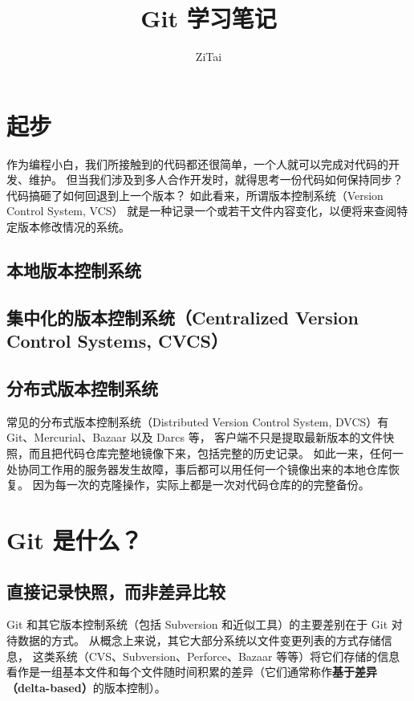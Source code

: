 \documentclass{ctexart}
\title{Git 学习笔记}
\author{ZiTai}
\date{\zhdate{2023/1/04}}
\begin{document}
\maketitle

\clearpage
\tableofcontents

\clearpage
\section{起步}
    作为编程小白，我们所接触到的代码都还很简单，一个人就可以完成对代码的开发、维护。
    但当我们涉及到多人合作开发时，就得思考一份代码如何保持同步？
    代码搞砸了如何回退到上一个版本？
    如此看来，所谓版本控制系统（Version Control System, VCS）
    就是一种记录一个或若干文件内容变化，以便将来查阅特定版本修改情况的系统。

\subsection*{本地版本控制系统}

\subsection*{集中化的版本控制系统（Centralized Version Control Systems, CVCS）}

\subsection*{分布式版本控制系统}
    常见的分布式版本控制系统（Distributed Version Control System, DVCS）有 Git、Mercurial、Bazaar 以及 Darcs 等，
    客户端不只是提取最新版本的文件快照，而且把代码仓库完整地镜像下来，包括完整的历史记录。
    如此一来，任何一处协同工作用的服务器发生故障，事后都可以用任何一个镜像出来的本地仓库恢复。
    因为每一次的克隆操作，实际上都是一次对代码仓库的的完整备份。

\clearpage
\section{Git 是什么？}
\subsection{直接记录快照，而非差异比较}
    Git 和其它版本控制系统（包括 Subversion 和近似工具）的主要差别在于 Git 对待数据的方式。
    从概念上来说，其它大部分系统以文件变更列表的方式存储信息，
    这类系统（CVS、Subversion、Perforce、Bazaar 等等）将它们存储的信息看作是一组基本文件和每个文件随时间积累的差异（它们通常称作\textbf{基于差异（delta-based）}的版本控制）。
\end{document}

